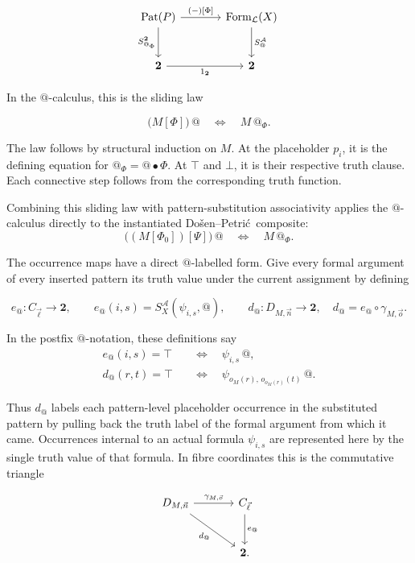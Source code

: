 \documentclass[11pt]{article}
\makeatletter
\newcommand{\atsign}{\mathord{@}}
\newcommand{\DP}{Do\v{s}en--Petri\'{c}}
\makeatother
\begin{document}
\[
\begin{tikzcd}[row sep=large,column sep=large]
\operatorname{Pat}(P) \arrow[r,"{(-)[\Phi]}"]
  \arrow[d,"S_{\atsign_\Phi}^{\mathbf 2}"'] &
\operatorname{Form}_{\mathcal L}(X)
  \arrow[d,"S_{\atsign}^{\mathcal A}"] \\
\mathbf 2 \arrow[r,"1_{\mathbf 2}"'] & \mathbf 2
\end{tikzcd}
\]

In the \(\atsign\)-calculus, this is the sliding law

\[
\boxed{
\bigl(M[\Phi]\bigr)\,\atsign
\quad\Longleftrightarrow\quad
M\,\atsign_\Phi.
}
\]

The law follows by structural induction on \(M\). At the placeholder
\(p_i\), it is the defining equation for
\(\atsign_\Phi=\atsign\mathbin\bullet\Phi\). At \(\top\) and \(\bot\), it is their
respective truth clause. Each connective step follows from the corresponding
truth function.

Combining this sliding law with pattern-substitution associativity applies the
\(\atsign\)-calculus directly to the instantiated \DP\ composite:
\[
\boxed{
\bigl((M[\Phi_0])[\Psi]\bigr)\,\atsign
\quad\Longleftrightarrow\quad
M\,\atsign_\Phi.
}
\]

The occurrence maps have a direct \(\atsign\)-labelled form. Give every
formal argument of every inserted pattern its truth value under the current
assignment by defining

\[
e_{\atsign}:C_{\vec\ell}\longrightarrow\mathbf 2,
\qquad
e_{\atsign}(i,s)=S_X^{\mathcal A}(\psi_{i,s},\atsign),
\qquad
d_{\atsign}:D_{M,\vec n}\longrightarrow\mathbf 2,
\quad d_{\atsign}=e_{\atsign}\circ\gamma_{M,\vec o}.
\]

In the postfix \(\atsign\)-notation, these definitions say
\[
\begin{aligned}
e_{\atsign}(i,s)=\top
&\quad\Longleftrightarrow\quad \psi_{i,s}\,\atsign,\\
d_{\atsign}(r,t)=\top
&\quad\Longleftrightarrow\quad
\psi_{o_M(r),\,o_{o_M(r)}(t)}\,\atsign.
\end{aligned}
\]

Thus \(d_{\atsign}\) labels each pattern-level placeholder occurrence in the
substituted pattern by pulling back the truth label of the formal argument from
which it came. Occurrences internal to an actual formula \(\psi_{i,s}\) are
represented here by the single truth value of that formula. In fibre
coordinates this is the commutative triangle

\[
\begin{tikzcd}[row sep=large,column sep=large]
D_{M,\vec n} \arrow[r,"\gamma_{M,\vec o}"]
  \arrow[dr,"d_{\atsign}"'] &
C_{\vec\ell} \arrow[d,"e_{\atsign}"] \\
& \mathbf 2.
\end{tikzcd}
\]
\end{document}
